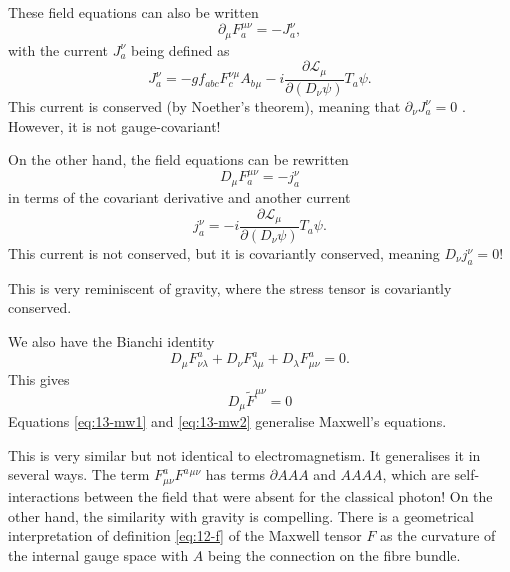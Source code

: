 These field equations can also be written
\begin{equation}
  \partial_{\mu} F^{\mu\nu}_a = -J^{\nu}_a,
\end{equation}
with the current $J^{\nu}_a$  being defined as
\begin{equation}
  J^{\nu}_a = -g f_{abc} F^{\nu\mu}_c A_b{}_{\mu} - i \frac{\partial \mathscr{L}_{\mu}}{\partial (D_{\nu} \psi)} T_a \psi.
\end{equation}
This current is conserved (by Noether's theorem), meaning that $\partial_{\nu} J^{\nu}_a =0$ .
However, it is not gauge-covariant!

On the other hand, the field equations can be rewritten
\begin{equation}
  \label{eq:13-mw1}
  \boxed{D_{\mu} F^{\mu\nu}_a = -j^{\nu}_a}
\end{equation}
in terms of the covariant derivative and another current
\begin{equation}
  j^{\nu}_a = -i \frac{\partial \mathscr{L}_{\mu}}{\partial (D_{\nu} \psi)} T_a \psi.
\end{equation}
This current is not conserved, but it is covariantly conserved, meaning $D_{\nu} j^{\nu}_a = 0$!
\begin{leftbar}
  This is very reminiscent of gravity, where the stress tensor is covariantly conserved.
\end{leftbar}

We also have the Bianchi identity
\begin{equation}
  D_{\mu} F^{a}_{\nu\lambda} + D_{\nu} F^{a}_{\lambda\mu} + D_{\lambda} F^{a}_{\mu\nu} =0.
\end{equation}
This gives
\begin{equation}
  \label{eq:13-mw2}
  \boxed{D_{\mu} \widetilde{F}^{\mu\nu} = 0}
\end{equation}
Equations \eqref{eq:13-mw1} and \eqref{eq:13-mw2} generalise Maxwell's equations.

This is very similar but not identical to electromagnetism. It generalises it in several ways.
The term $F^a_{\mu\nu} F^a{}^{\mu\nu}$ has terms $\partial A A A$ and $A A A A$, which are self-interactions between the field that were absent for the classical photon!
On the other hand, the similarity with gravity is compelling.
There is a geometrical interpretation of definition \eqref{eq:12-f} of the Maxwell tensor $F$ as the curvature of the internal gauge space with $A$ being the connection on the fibre bundle.
